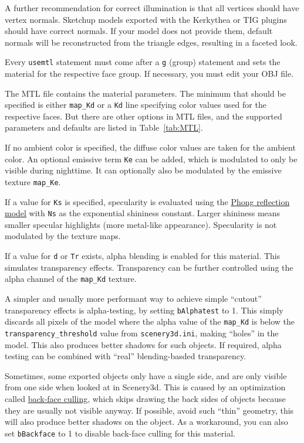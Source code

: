 \documentclass[a4paper]{article}
\newcommand{\filename}[1]{\texttt{#1}}
\newcommand{\cmd}[1]{\texttt{#1}}
\begin{document}
A further recommendation for correct illumination is that all vertices should  have
vertex normals. Sketchup models exported with the Kerkythea or TIG plugins
should have correct normals. If your model does not provide them, 
default normals will be reconstructed from the triangle edges, resulting in a faceted look.

Every \cmd{usemtl} statement must come after a \cmd{g} (group) statement and sets
the material for the respective face group. If necessary, you must
edit your OBJ file.

The MTL file contains the material parameters. The minimum that should be specified is 
either \cmd{map\_Kd} or a \cmd{Kd} line specifying color values used for the respective faces. But there are other options in MTL files, and the supported parameters and defaults are listed in Table~\ref{tab:MTL}.

If no ambient color is specified, the diffuse color values are taken for the ambient color. An optional emissive term \cmd{Ke} can be added, which is modulated to only be visible during nighttime. It can optionally also be modulated by the emissive texture \cmd{map\_Ke}. 

If a value for \cmd{Ks} is specified, specularity is evaluated using the \href{https://en.wikipedia.org/wiki/Phong_reflection_model}{Phong reflection model} with \cmd{Ns} as the exponential shininess constant. Larger shininess means smaller specular highlights (more metal-like appearance). Specularity is not modulated by the texture maps.

If a value for \cmd{d} or \cmd{Tr} exists, alpha blending is enabled for this material. This simulates transparency effects. Transparency can be further controlled using the alpha channel of the \cmd{map\_Kd} texture.

A simpler and usually more performant way to achieve simple ``cutout'' transparency effects is alpha-testing, by setting \cmd{bAlphatest} to 1. This simply discards all pixels of the model where the alpha value of the \cmd{map\_Kd} is below the \cmd{transparency\_threshold} value from \filename{scenery3d.ini}, making ``holes'' in the model. This also produces better shadows for such objects. If required, alpha testing can be combined with ``real'' blending-basded transparency.

Sometimes, some exported objects only have a single side, and are only visible from one side when looked at in Scenery3d. This is caused by an optimization called \href{https://en.wikipedia.org/wiki/Back-face_culling}{back-face culling}, which skips drawing the back sides of objects because they are usually not visible anyway. If possible, avoid such ``thin'' geometry, this will also produce better shadows on the object. As a workaround, you can also set \cmd{bBackface} to 1 to disable back-face culling for this material.
\end{document}
